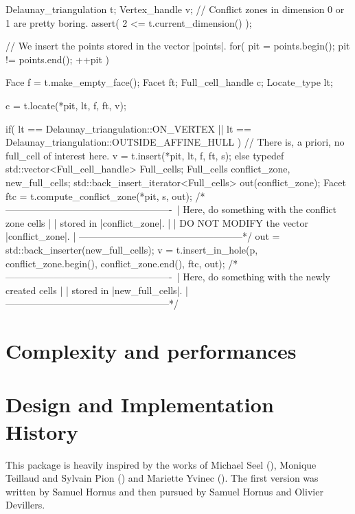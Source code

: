 \begin{ccExampleCode}
Delaunay_triangulation t;
Vertex_handle v;
// Conflict zones in dimension 0 or 1 are pretty boring.
assert( 2 <= t.current_dimension() );

// We insert the points stored in the vector |points|.
for( pit = points.begin(); pit != points.end(); ++pit )
{
    Face             f = t.make_empty_face();
    Facet            ft;
    Full_cell_handle c;
    Locate_type      lt;

    c = t.locate(*pit, lt, f, ft, v);

    if(    lt == Delaunay_triangulation::ON_VERTEX
        || lt == Delaunay_triangulation::OUTSIDE_AFFINE_HULL )
    {
        // There is, a priori, no full_cell of interest here.
        v = t.insert(*pit, lt, f, ft, s);
    }
    else
    {
        typedef std::vector<Full_cell_handle> Full_cells;
        Full_cells conflict_zone, new_full_cells;
        std::back_insert_iterator<Full_cells> out(conflict_zone);
        Facet ftc = t.compute_conflict_zone(*pit, s, out);
        /*----------------------------------------------------\
        | Here, do something with the conflict zone cells     |
        | stored in |conflict_zone|.                          |
        | DO NOT MODIFY the vector |conflict_zone|.           |
        \----------------------------------------------------*/
        out = std::back_inserter(new_full_cells);
        v = t.insert_in_hole(p, conflict_zone.begin(), conflict_zone.end(), ftc, out);
        /*----------------------------------------------------\
        |  Here, do something with the newly created cells    |
        |  stored in |new_full_cells|.                        |
        \----------------------------------------------------*/
    }
}
\end{ccExampleCode}

\section{Complexity and performances}


\section{Design and Implementation History}

This package is heavily inspired by the works of Michael Seel
(), Monique Teillaud and Sylvain Pion ()
and Mariette Yvinec (\ccc{Triangulation_2}).
The first version was written by Samuel Hornus and then
pursued by Samuel Hornus and Olivier Devillers.
